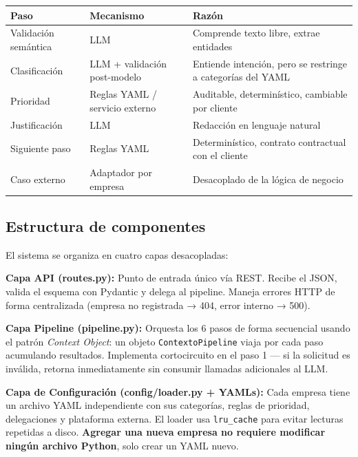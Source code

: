 \documentclass[9pt,letterpaper]{article}
\begin{document}
\begin{center}
\small
\begin{tabular}{@{}lll@{}}
\toprule
\textbf{Paso} & \textbf{Mecanismo} & \textbf{Razón} \\
\midrule
Validación semántica & LLM & Comprende texto libre, extrae entidades \\
Clasificación & LLM + validación post-modelo & Entiende intención, pero se restringe a categorías del YAML \\
Prioridad & Reglas YAML / servicio externo & Auditable, determinístico, cambiable por cliente \\
Justificación & LLM & Redacción en lenguaje natural \\
Siguiente paso & Reglas YAML & Determinístico, contrato contractual con el cliente \\
Caso externo & Adaptador por empresa & Desacoplado de la lógica de negocio \\
\bottomrule
\end{tabular}
\end{center}

\subsection{Estructura de componentes}

El sistema se organiza en cuatro capas desacopladas:

\begin{tcolorbox}
\textbf{Capa API (routes.py):} Punto de entrada único vía REST. Recibe el JSON, valida el esquema con Pydantic y delega al pipeline. Maneja errores HTTP de forma centralizada (empresa no registrada → 404, error interno → 500).
\end{tcolorbox}

\vspace{2pt}

\begin{tcolorbox}
\textbf{Capa Pipeline (pipeline.py):} Orquesta los 6 pasos de forma secuencial usando el patrón \textit{Context Object}: un objeto \texttt{ContextoPipeline} viaja por cada paso acumulando resultados. Implementa cortocircuito en el paso 1 --- si la solicitud es inválida, retorna inmediatamente sin consumir llamadas adicionales al LLM.
\end{tcolorbox}

\vspace{2pt}

\begin{tcolorbox}
\textbf{Capa de Configuración (config/loader.py + YAMLs):} Cada empresa tiene un archivo YAML independiente con sus categorías, reglas de prioridad, delegaciones y plataforma externa. El loader usa \texttt{lru\_cache} para evitar lecturas repetidas a disco. \textbf{Agregar una nueva empresa no requiere modificar ningún archivo Python}, solo crear un YAML nuevo.
\end{tcolorbox}
\end{document}
